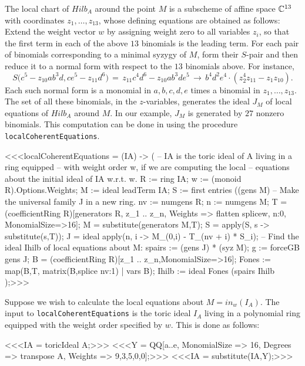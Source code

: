 The local chart of $Hilb_A$ around the point $M$
is a subscheme of affine space $\mathbb{C}^{13}$ with coordinates 
$z_1, \ldots, z_{13}$, whose
defining equations are obtained as follows: 
Extend the weight vector $w$ by assigning
weight zero to all variables $z_i$, so that
the first term in each of the above $13$ binomials
is the leading term. For each pair of binomials corresponding to a  
minimal syzygy of $M$, form their $S$-pair and then reduce it to a 
normal form with respect to the $13$ binomials above.
For instance,
$$
S \bigl(
 c^5 - z_{10} a b^3 d , 
 c e^5 - z_{11} d^6 \bigr)
\, = \,
 z_{11} c^4 d^6  - z_{10} a b^3 d e^5
\, \longrightarrow \,
b^4 d^2 e^4 \cdot (z_2^4 z_{11} - z_1 z_{10}).
$$
Each such normal form is a monomial in $a,b,c,d,e$ times a binomial in
$z_1, \ldots, z_{13}$.  The set of all these binomials, in the
$z$-variables, generates the ideal $J_M$ of local equations of
$Hilb_A$ around $M$.  In our example, $J_M$ is generated by $27$
nonzero binomials.  This computation can be done in \Mtwo using the
procedure {\tt localCoherentEquations}.

<<<localCoherentEquations = (IA) -> (
     -- IA is the toric ideal of A living in a ring equipped
     -- with weight order w, if we are computing the local 
     -- equations about the initial ideal of IA w.r.t. w.
     R := ring IA;
     w := (monoid R).Options.Weights;
     M := ideal leadTerm IA;
     S := first entries ((gens M) %
     -- Make the universal family J in a new ring.
     nv := numgens R; n := numgens M;
     T = (coefficientRing R)[generators R, z_1 .. z_n, 
                             Weights => flatten splice{w, n:0},
                             MonomialSize=>16];
     M = substitute(generators M,T);
     S = apply(S, s -> substitute(s,T));
     J = ideal apply(n, i -> 
               M_(0,i) - T_(nv + i) * S_i);
     -- Find the ideal Ihilb of local equations about M:
     spairs := (gens J) * (syz M);
     g := forceGB gens J;
     B = (coefficientRing R)[z_1 .. z_n,MonomialSize=>16];
     Fones := map(B,T, matrix(B,{splice {nv:1}}) | vars B);
     Ihilb := ideal Fones (spairs %
     Ihilb
     );>>> 
     
Suppose we wish to calculate the local equations about $M =
in_w(I_A)$.  The input to {\tt localCoherentEquations} is the
toric ideal $I_A$ living in a polynomial ring equipped with the 
weight order specified by $w$. This is done as follows:

<<<IA = toricIdeal A;>>>
<<<Y = QQ[a..e, MonomialSize => 16,
            Degrees => transpose A, Weights => {9,3,5,0,0}];>>>
<<<IA = substitute(IA,Y);>>>

